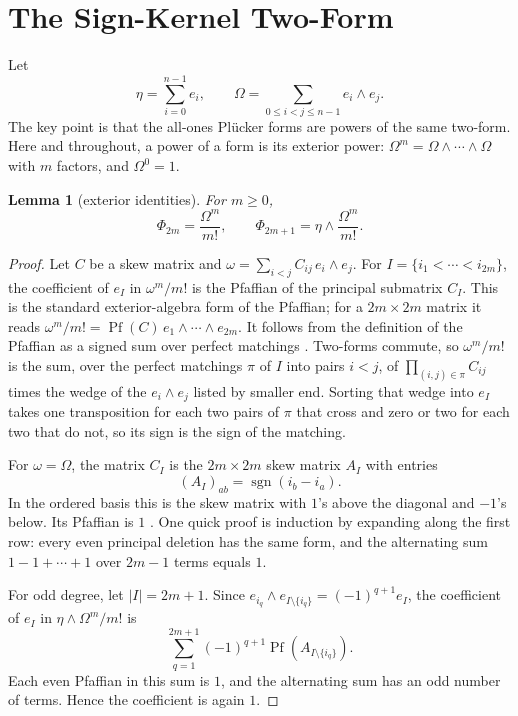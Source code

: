 \documentclass[11pt]{article}
\newtheorem{lemma}[theorem]{Lemma}
\begin{document}
\section{The Sign-Kernel Two-Form}

Let
\[
  \eta=\sum_{i=0}^{n-1} e_i,
  \qquad
  \Omega=\sum_{0\leq i<j\leq n-1} e_i\wedge e_j.
\]
The key point is that the all-ones Plücker forms are powers of the same
two-form.  Here and throughout, a power of a form is its exterior power:
\(\Omega^m=\Omega\wedge\cdots\wedge\Omega\) with \(m\) factors, and \(\Omega^0=1\).

\begin{lemma}[exterior identities]
\label{lem:exterior-identities}
For \(m\geq 0\),
\[
  \Phi_{2m}=\frac{\Omega^m}{m!},
  \qquad
  \Phi_{2m+1}=\eta\wedge\frac{\Omega^m}{m!}.
\]
\end{lemma}

\begin{proof}
Let \(C\) be a skew matrix and \(\omega=\sum_{i<j}C_{ij}\,e_i\wedge e_j\). For
\(I=\{i_1<\cdots<i_{2m}\}\), the coefficient of \(e_I\) in \(\omega^m/m!\) is the
Pfaffian of the principal submatrix \(C_I\). This is the standard exterior-algebra
form of the Pfaffian; for a \(2m\times 2m\) matrix it reads
\(\omega^m/m!=\operatorname{Pf}(C)\,e_1\wedge\cdots\wedge e_{2m}\). It follows from
the definition of the Pfaffian as a signed sum over perfect matchings
\cite[\S2]{Stembridge1990}. Two-forms commute, so \(\omega^m/m!\) is the sum, over
the perfect matchings \(\pi\) of \(I\) into pairs \(i<j\), of
\(\prod_{(i,j)\in\pi}C_{ij}\) times the wedge of the \(e_i\wedge e_j\) listed by
smaller end. Sorting that wedge into \(e_I\) takes one transposition for each two
pairs of \(\pi\) that cross and zero or two for each two that do not, so its sign
is the sign of the matching.

For \(\omega=\Omega\), the matrix \(C_I\) is the \(2m\times 2m\) skew matrix
\(A_I\) with entries
\[
  (A_I)_{ab}=\operatorname{sgn}(i_b-i_a).
\]
In the ordered basis this is the skew matrix with \(1\)'s above the diagonal
and \(-1\)'s below.  Its Pfaffian is \(1\)
\cite[Proposition~2.3(c)]{Stembridge1990}.  One quick proof is induction by
expanding along the first row: every even principal deletion has the same
form, and the alternating sum \(1-1+\cdots+1\) over \(2m-1\) terms equals
\(1\).

For odd degree, let \(|I|=2m+1\). Since
\(e_{i_q}\wedge e_{I\setminus\{i_q\}}=(-1)^{q+1}e_I\), the coefficient of
\(e_I\) in \(\eta\wedge\Omega^m/m!\) is
\[
  \sum_{q=1}^{2m+1}(-1)^{q+1}
  \operatorname{Pf}(A_{I\setminus\{i_q\}}).
\]
Each even Pfaffian in this sum is \(1\), and the alternating sum has an odd
number of terms.  Hence the coefficient is again \(1\).
\end{proof}
\end{document}
